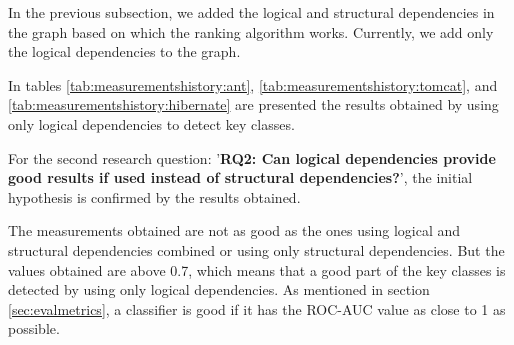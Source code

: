 \documentclass[runningheads]{comsis2}
\begin{document}
In the previous subsection, we added the logical and structural dependencies in the graph based on which the ranking algorithm works. Currently, we add only the logical dependencies to the graph.

In tables \ref{tab:measurementshistory:ant}, \ref{tab:measurementshistory:tomcat}, and \ref{tab:measurementshistory:hibernate} are presented the results obtained by using only logical dependencies to detect key classes.

For the second research question: '\textbf{RQ2: Can logical dependencies provide good results if used instead of structural dependencies?}', the initial hypothesis is confirmed by the results obtained.

The measurements obtained are not as good as the ones using logical and structural dependencies combined or using only structural dependencies. But the values obtained are above 0.7, which means that a good part of the key classes is detected by using only logical dependencies. As mentioned in section \ref{sec:evalmetrics}, a classifier is good if it has the ROC-AUC value as close to 1 as possible.


\begin{table}[!h]
\setlength\tabcolsep{3.5pt}
\caption{Measurements for Ant using only logical dependencies}
\label{tab:measurementshistory:ant}
\centering
{}
\end{table}
\end{document}
